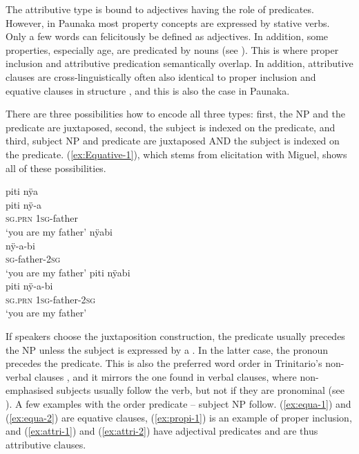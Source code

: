 The attributive type is bound to adjectives having the role of predicates. However, in Paunaka most property concepts are expressed by stative verbs. Only a few words can felicitously be defined as adjectives. In addition, some properties, especially age, are predicated by nouns (see ). This is where proper inclusion and attributive predication semantically overlap. In addition, attributive clauses are cross-linguistically often also identical to proper inclusion and equative clauses in structure \citep[120]{Payne1997}, and this is also the case in Paunaka. 

There are three possibilities how to encode all three types: first, the  NP and the predicate are juxtaposed, second, the subject is indexed on the predicate, and third, subject NP and predicate are juxtaposed AND the subject is indexed on the predicate. (\ref{ex:Equative-1}), which stems from elicitation with Miguel, shows all of these possibilities. 
 
\ea\label{ex:Equative-1}
  \ea
 \begingl 
\glpreamble piti nÿa \\
\gla piti nÿ-a\\ 
\textsc{sg.prn} 1\textsc{sg}-father\\ 
\glft ‘you are my father’
  \ex
 \begingl 
\glpreamble nÿabi\\
\gla nÿ-a-bi\\ 
\textsc{sg}-father-2\textsc{sg}\\ 
\glft ‘you are my father’
  \ex
 \begingl
\glpreamble piti nÿabi\\
\gla piti nÿ-a-bi\\
\textsc{sg.prn} 1\textsc{sg}-father-2\textsc{sg}\\
\glft ‘you are my father’
\endgl
\trailingcitation{[mxx-e090728s-3.088-090]}
\z
\xe

If speakers choose the juxtaposition construction, the predicate usually precedes the  NP unless the subject is expressed by a . In the latter case, the pronoun precedes the predicate. This is also the preferred word order in Trinitario’s non-verbal clauses \citep[75]{Rose2018}, and it mirrors the one found in verbal clauses, where non-emphasised subjects usually follow the verb, but not if they are pronominal (see ). A few examples with the order predicate -- subject NP follow. (\ref{ex:equa-1}) and (\ref{ex:equa-2}) are equative clauses, (\ref{ex:propi-1}) is an example of proper inclusion, and (\ref{ex:attri-1}) and (\ref{ex:attri-2}) have adjectival predicates and are thus attributive clauses.

